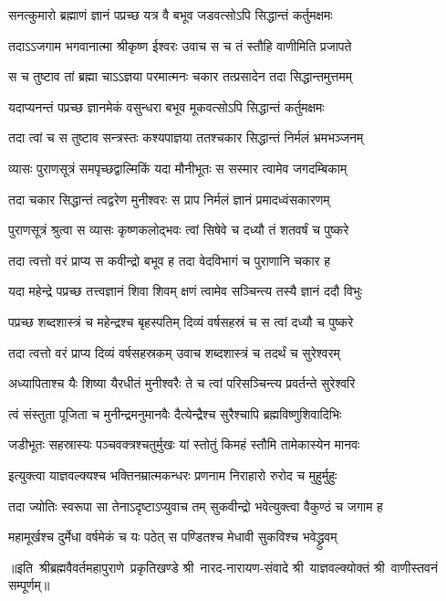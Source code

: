\twolineshloka
{सनत्कुमारो ब्रह्माणं ज्ञानं पप्रच्छ यत्र वै}
{बभूव जडवत्सोऽपि सिद्धान्तं कर्तुमक्षमः}%

\twolineshloka
{तदाऽऽजगाम भगवानात्मा श्रीकृष्ण ईश्वरः}
{उवाच स च तं स्तौहि वाणीमिति प्रजापते}%

\twolineshloka
{स च तुष्टाव तां ब्रह्मा चाऽऽज्ञया परमात्मनः}
{चकार तत्प्रसादेन तदा सिद्धान्तमुत्तमम्}%

\twolineshloka
{यदाप्यनन्तं पप्रच्छ ज्ञानमेकं वसुन्धरा}
{बभूव मूकवत्सोऽपि सिद्धान्तं कर्तुमक्षमः}%

\twolineshloka
{तदा त्वां च स तुष्टाव सन्त्रस्तः कश्यपाज्ञया}
{ततश्चकार सिद्धान्तं निर्मलं भ्रमभञ्जनम्}%

\twolineshloka
{व्यासः पुराणसूत्रं समपृच्छद्वाल्मिकिं यदा}
{मौनीभूतः स सस्मार त्वामेव जगदम्बिकाम्}%

\twolineshloka
{तदा चकार सिद्धान्तं त्वद्वरेण मुनीश्वरः}
{स प्राप निर्मलं ज्ञानं प्रमादध्वंसकारणम्}%

\twolineshloka
{पुराणसूत्रं श्रुत्वा स व्यासः कृष्णकलोद्भवः}
{त्वां सिषेवे च दध्यौ तं शतवर्षं च पुष्करे}%

\twolineshloka
{तदा त्वत्तो वरं प्राप्य स कवीन्द्रो बभूव ह}
{तदा वेदविभागं च पुराणानि चकार ह}%

\twolineshloka
{यदा महेन्द्रे पप्रच्छ तत्त्वज्ञानं शिवा शिवम्}
{क्षणं त्वामेव सञ्चिन्त्य तस्यै ज्ञानं ददौ विभुः}%

\twolineshloka
{पप्रच्छ शब्दशास्त्रं च महेन्द्रश्च बृहस्पतिम्}
{दिव्यं वर्षसहस्रं च स त्वां दध्यौ च पुष्करे}%

\twolineshloka
{तदा त्वत्तो वरं प्राप्य दिव्यं वर्षसहस्रकम्}
{उवाच शब्दशास्त्रं च तदर्थं च सुरेश्वरम्}%

\twolineshloka
{अध्यापिताश्च यैः शिष्या यैरधीतं मुनीश्वरैः}
{ते च त्वां परिसञ्चिन्त्य प्रवर्तन्ते सुरेश्वरि}%

\twolineshloka
{त्वं संस्तुता पूजिता च मुनीन्द्रमनुमानवैः}
{दैत्येन्द्रैश्च सुरैश्चापि ब्रह्मविष्णुशिवादिभिः}%

\twolineshloka
{जडीभूतः सहस्रास्यः पञ्चवक्त्रश्चतुर्मुखः}
{यां स्तोतुं किमहं स्तौमि तामेकास्येन मानवः}%

\twolineshloka
{इत्युक्त्वा याज्ञवल्क्यश्च भक्तिनम्रात्मकन्धरः}
{प्रणनाम निराहारो रुरोद च मुहुर्मुहुः}%

\twolineshloka
{तदा ज्योतिः स्वरूपा सा तेनाऽदृष्टाऽप्युवाच तम्}
{सुकवीन्द्रो भवेत्युक्त्वा वैकुण्ठं च जगाम ह}%

\twolineshloka
{महामूर्खश्च दुर्मेधा वर्षमेकं च यः पठेत्}
{स पण्डितश्च मेधावी सुकविश्च भवेद्ध्रुवम्}%

{॥इति~श्रीब्रह्मवैवर्तमहापुराणे~प्रकृतिखण्डे श्री~नारद-नारायण-संवादे श्री~याज्ञवल्क्योक्तं श्री~वाणीस्तवनं सम्पूर्णम्॥}